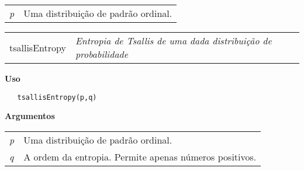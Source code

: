 \documentclass[12pt,letterpaper]{article}
\begin{document}
\begin{table}[!h]
\begin{center}
\begin{tabularx}{\textwidth}{X X}
\hspace{0.5cm} \textit{p} & Uma distribuição de padrão ordinal.\\
\end{tabularx}
\end{center}
\end{table} 

\hrulefill   

\begin{table}[!h]
\begin{center}
\begin{tabularx}{\textwidth}{ X X}
\hspace{0.5cm} tsallisEntropy & \textit{Entropia de Tsallis de uma dada distribuição de probabilidade}\\
\end{tabularx}
\end{center}
\end{table} 

\vspace{-0.5cm}

\hrulefill  

\vspace{0.5cm}

\textbf{Uso}

\begin{lstlisting}
   tsallisEntropy(p,q)
\end{lstlisting}

\vspace{0.5cm}

\textbf{Argumentos}

\begin{table}[!h]
\begin{center}
\begin{tabularx}{\textwidth}{X X}
\hspace{0.5cm} \textit{p} \vspace{0.5cm}& Uma distribuição de padrão ordinal.\vspace{0.5cm}\\
\hspace{0.5cm} \textit{q} \vspace{0.5cm}& A ordem da entropia. Permite apenas números positivos.\vspace{0.5cm}\\
\end{tabularx}
\end{center}
\end{table} 
\end{document}
